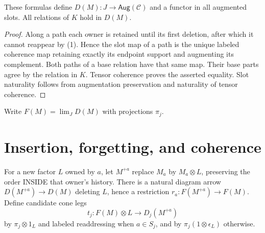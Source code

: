 \documentclass[11pt]{article}
\newcommand{\Aug}{\mathsf{Aug}}\newcommand{\supp}{\mathop{\rm supp}}
\begin{document}
\begin{lemma}
These formulas define $D(M):J\to\Aug(\mathcal C)$ and a functor in all augmented slots. All relations of $K$ hold in $D(M)$.
\end{lemma}
\begin{proof}
Along a path each owner is retained until its first deletion, after which it cannot reappear by (1). Hence the slot map of a path is the unique labeled coherence map retaining exactly its endpoint support and augmenting its complement. Both paths of a base relation have that same map. Their base parts agree by the relation in $K$. Tensor coherence proves the asserted equality. Slot naturality follows from augmentation preservation and naturality of tensor coherence.
\end{proof}
Write $F(M)=\lim_J D(M)$ with projections $\pi_j$.

\section{Insertion, forgetting, and coherence}
For a new factor $L$ owned by $a$, let $M^{+a}$ replace $M_a$ by $M_a\otimes L$, preserving the order INSIDE that owner's history. There is a natural diagram arrow $D(M^{+a})\to D(M)$ deleting $L$, hence a restriction $r_a:F(M^{+a})\to F(M)$. Define candidate cone legs
\[
 t_j:F(M)\otimes L\longrightarrow D_j(M^{+a})
\]
by $\pi_j\otimes1_L$ and labeled readdressing when $a\in S_j$, and by $\pi_j(1\otimes\epsilon_L)$ otherwise.
\end{document}
